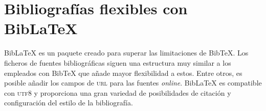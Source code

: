 \documentclass[11pt,a4paper]{article}
\begin{document}
\section{Bibliografías flexibles con Bib\LaTeX}
Bib\LaTeX{} es un paquete creado para superar las limitaciones de Bib\TeX. Los ficheros de fuentes bibliográficas siguen una estructura muy similar a los empleados con Bib\TeX{} que añade mayor flexibilidad a estos. Entre otros, es posible añadir los campos de \textsc{url} para las fuentes \emph{online}. Bib\LaTeX{} es compatible con \textsc{utf8} y proporciona una gran variedad de posibilidades de citación y configuración del estilo de la bibliografía. 






\nocite{*} %
\printbibliography[title=Bibliografía]
\end{document}
